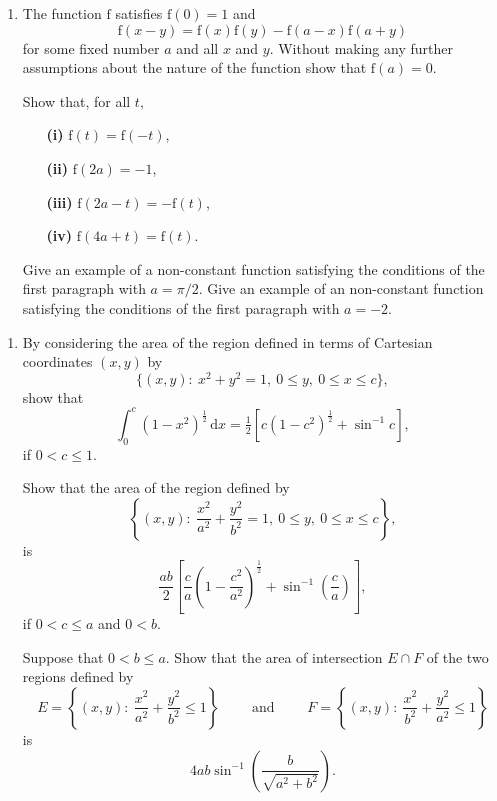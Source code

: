 \documentclass[a4, 11pt]{report}
\newlength{\qspace}
\newcounter{qnumber}
\newenvironment{question}%
 {\vspace{\qspace}
  \begin{enumerate}[\bfseries 1\quad][10]%
    \setcounter{enumi}{\value{qnumber}}%
    \item%
 }
{
  \end{enumerate}
  \filbreak
  \stepcounter{qnumber}
 }
\begin{document}
\begin{question}
The function $\mathrm{f}$ satisfies $\mathrm{f}(0)=1$ and 
\[
\mathrm{f}(x-y)=\mathrm{f}(x)\mathrm{f}(y)-\mathrm{f}(a-x)\mathrm{f}(a+y)
\]
for some fixed number $a$ and all $x$ and $y$. Without making any
further assumptions about the nature of the function show that $\mathrm{f}(a)=0$. 


Show that, for all $t$, 


\begin{itemize}
\setlength{\itemsep}{3mm}

\item[\bf (i)] $\mathrm{f}(t)=\mathrm{f}(-t)$, 
\item[\bf (ii)] $\mathrm{f}(2a)=-1$, 
\item[\bf (iii)] $\mathrm{f}(2a-t)=-\mathrm{f}(t)$, 
\item[\bf (iv)] $\mathrm{f}(4a+t)=\mathrm{f}(t)$. 
\end{itemize}

Give an example of a non-constant function satisfying the conditions
of the first paragraph with $a=\pi/2$. Give an example of an non-constant
function satisfying the conditions of the first paragraph with $a=-2$. 
\end{question}

\begin{question}
By considering the area of the region defined in terms of Cartesian
coordinates $(x,y)$ by \[
\{(x,y):\ x^{2}+y^{2}=1,\ 0\leqslant y,\ 0\leqslant x\leqslant c\},
\]
show that 
\[
\int_{0}^{c}(1-x^{2})^{\frac{1}{2}}\,\mathrm{d}x=\tfrac{1}{2}[c(1-c^{2})^{\frac{1}{2}}+\sin^{-1}c],
\]
if $0<c\leqslant1.$


Show that the area of the region defined by 
\[
\left\{ (x,y):\ \frac{x^{2}}{a^{2}}+\frac{y^{2}}{b^{2}}=1,\ 0\leqslant y,\ 0\leqslant x\leqslant c\right\} ,
\]
is 
\[
\frac{ab}{2}\left[\frac{c}{a}\left(1-\frac{c^{2}}{a^{2}}\right)^{\frac{1}{2}}+\sin^{-1}\left(\frac{c}{a}\right)\right],
\]
if $0<c\leqslant a$ and $0<b.$ 


Suppose that $0<b\leqslant a.$ Show that the area of intersection
$E\cap F$ of the two regions defined by 
\[
E=\left\{ (x,y):\ \frac{x^{2}}{a^{2}}+\frac{y^{2}}{b^{2}}\leqslant1\right\} \qquad\mbox{ and }\qquad F=\left\{ (x,y):\ \frac{x^{2}}{b^{2}}+\frac{y^{2}}{a^{2}}\leqslant1\right\} 
\]
is 
\[
4ab\sin^{-1}\left(\frac{b}{\sqrt{a^{2}+b^{2}}}\right).
\]
	\end{question}
\end{document}
